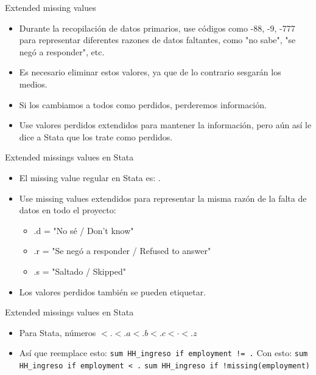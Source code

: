 \documentclass[10pt, aspectratio=169, compress]{beamer}
\begin{document}
\begin{frame}[t]{Extended missing values}
	\begin{itemize}
		\item Durante la recopilación de datos primarios, use códigos como -88, -9, -777 para representar diferentes razones de datos faltantes, como "no sabe", "se negó a responder", etc.
		\item Es necesario eliminar estos valores, ya que de lo contrario sesgarán los medios.
		\item Si los cambiamos a todos como perdidos, perderemos información.
		\item Use valores perdidos extendidos para mantener la información, pero aún así le dice a Stata que los trate como perdidos.
	\end{itemize}
\end{frame}
\begin{frame}[t]{Extended missings values en Stata}
	\begin{itemize}
		\item El missing value  regular en Stata es: .
		\item Use missing values extendidos para representar la misma razón de la falta de datos en todo el proyecto:
		\begin{itemize}
			\item .d = "No sé / Don't know"
			\item .r = "Se negó a responder / Refused to answer"
			\item .s = "Saltado / Skipped"
		\end{itemize}
		\item Los valores perdidos también se pueden etiquetar.
	\end{itemize}
\end{frame}
\begin{frame}[t]{Extended missings values en Stata}
	\begin{itemize}
		\item Para Stata, números $ < . < .a < .b < .c < \cdot < .z $
		\item Así que reemplace esto:
		\linebreak
		\texttt{sum HH\_ingreso if employment != .}
		\linebreak
		Con esto:
		\linebreak
		\texttt{sum HH\_ingreso if employment < .}
		\linebreak
		\texttt{sum HH\_ingreso if !missing(employment)}
	\end{itemize}
\end{frame}
\end{document}
